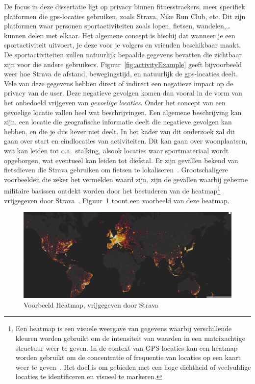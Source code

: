 De focus in deze dissertatie ligt op privacy binnen fitnesstrackers, meer
specifiek platformen die \ac{gps}-locaties gebruiken, zoals Strava, Nike Run
Club, etc. Dit zijn platformen waar personen sportactiviteiten zoals lopen,
fietsen, wandelen,\ldots kunnen delen met elkaar. Het algemene concept is
hierbij dat wanneer je een sportactiviteit uitvoert, je deze voor je volgers en
vrienden beschikbaar maakt. De sportactiviteiten zullen natuurlijk bepaalde
gegevens bevatten die zichtbaar zijn voor die andere gebruikers.
Figuur~\ref{fig:activityExample} geeft bijvoorbeeld weer hoe Strava de afstand,
bewegingstijd, en natuurlijk de \ac{gps}-locaties deelt. Vele van deze gegevens
hebben direct of indirect een negatieve impact op de privacy van de user. Deze
negatieve gevolgen komen dan vooral in de vorm van het onbedoeld vrijgeven van
\textit{gevoelige locaties}. Onder het concept van een gevoelige locatie vallen
heel wat beschrijvingen. Een algemene beschrijving kan zijn, een locatie die
geografische informatie deelt die negatieve gevolgen kan hebben, en die je dus
liever niet deelt. In het kader van dit onderzoek zal dit gaan over start en
eindlocaties van activiteiten. Dit kan gaan over woonplaatsen, wat kan leiden
tot o.a.\ stalking, alsook locaties waar sportmateriaal wordt opgeborgen, wat
eventueel kan leiden tot diefstal. Er zijn gevallen bekend van fietsdieven die
Strava gebruiken om fietsen te lokaliseren~\cite{Sportapp72:online,
    Cyclistw89:online}. Grootschaligere voorbeelden die zeker het vermelden waard
zijn, zijn de gevallen waarbij geheime militaire basissen ontdekt worden door
het bestuderen van de heatmap\footnote{Een heatmap is een visuele weergave van
    gegevens waarbij verschillende kleuren worden gebruikt om de intensiteit van
    waarden in een matrixachtige structuur weer te geven. In de context van
    GPS-locaties kan een heatmap worden gebruikt om de concentratie of frequentie
    van locaties op een kaart weer te geven~\cite{Whatishe21:online}. Het doel is
    om gebieden met een hoge dichtheid of veelvuldige locaties te identificeren en
    visueel te markeren.} vrijgegeven door Strava~\cite{Fitnesst33:online}.
Figuur~\ref{fig:heatmap} toont een voorbeeld van deze heatmap.
\begin{figure}
    \centering
    \includegraphics[width=\textwidth]{fig/Heatmap_strava.png}
    \caption{Voorbeeld Heatmap, vrijgegeven door Strava~\cite{StravaGl10:online}}\label{fig:heatmap}
\end{figure}
